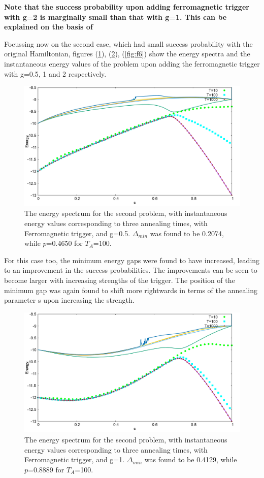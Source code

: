 \documentclass[12]{article}
\begin{document}
\textbf{Note that the success probability upon adding ferromagnetic trigger with g=2 is marginally small than that with g=1. This can be explained on the basis of}


Focussing now on the second case, which had small success probability with the original Hamiltonian, figures (\ref{fig:f4}), (\ref{fig:f5}), (\ref{fig:f6}) show the energy spectra and the instantaneous energy values of the problem upon adding the ferromagnetic trigger with g=0.5, 1 and 2 respectively. 
\begin{figure}[H]
\centering 
\includegraphics[scale=0.3]{950_s12_F_g0.png}
\caption{The energy spectrum for the second problem, with instantaneous energy values corresponding to three annealing times, with Ferromagnetic trigger, and g=0.5. $\Delta_{min}$ was found to be 0.2074, while $p$=0.4650 for $T_A$=100.}
\label{fig:f4}
\end{figure}
For this case too, the minimum energy gaps were found to have increased, leading to an improvement in the success probabilities. The improvements can be seen to become larger with increasing strengths of the trigger. The position of the minimum gap was again found to shift more rightwards in terms of the annealing parameter s upon increasing the strength. \\
\begin{figure}[H]
\centering 
\includegraphics[scale=0.3]{950_s12_F_g1.png}
\caption{The energy spectrum for the second problem, with instantaneous energy values corresponding to three annealing times, with Ferromagnetic trigger, and g=1. $\Delta_{min}$ was found to be 0.4129, while $p$=0.8889 for $T_A$=100.}
\label{fig:f5}
\end{figure}
\end{document}
